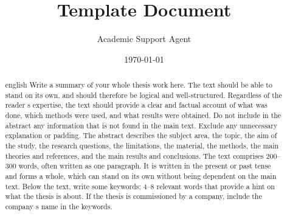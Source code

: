 \documentclass{article}
\title{Template Document}
\author{Academic Support Agent}
\date{\today}
\begin{document}
\maketitle

\begin{titlepage}
\maketitle
\end{titlepage}

\begin{abstract}{english}
Write a summary of your whole thesis work here. The text should be able to stand on its own, and should therefore be logical and well-structured. Regardless of the reader s expertise, the text should provide a clear and factual account of what was done, which methods were used, and what results were obtained. Do not include in the abstract any information that is not found in the main text. Exclude any unnecessary explanation or padding. The abstract describes the subject area, the topic, the aim of the study, the research questions, the limitations, the material, the methods, the main theories and references, and the main results and conclusions. The text comprises 200--300 words, often written as one paragraph. It is written in the present or past tense and forms a whole, which can stand on its own without being dependent on the main text. Below the text, write some keywords; 4--8 relevant words that provide a hint on what the thesis is about. If the thesis is commissioned by a company, include the company s name in the keywords.
\end{abstract}








\end{document}
